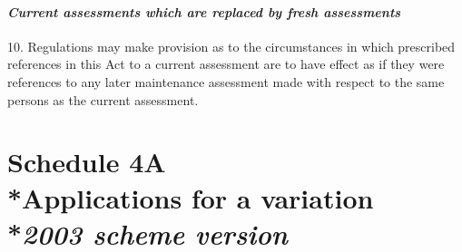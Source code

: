\documentclass[12pt,a4paper]{article}
\begin{document}

%
%
%
%

\subsection*{\itshape Current assessments which are replaced by fresh assessments}

10. Regulations may make provision as to the circumstances in which prescribed references in this Act to a current assessment are to have effect as if they were references to any later maintenance assessment made with respect to the same persons as the current assessment.

\part[Schedule 4A --- Applications for a variation --- \emph{2003 scheme version}]{\noindent S\lowercase{CHEDULE} 4A\\*Applications for a variation\\*\emph{2003 scheme version}}
\end{document}
